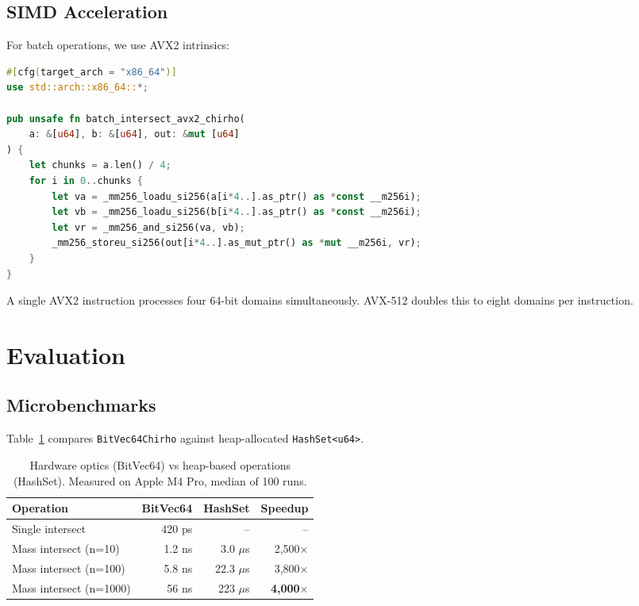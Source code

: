 \documentclass[11pt,a4paper]{article}
\newcommand{\bitvec}{\texttt{BitVec64Chirho}\xspace}
\begin{document}
\subsection{SIMD Acceleration}
\label{sec:simd}

For batch operations, we use AVX2 intrinsics:

\begin{lstlisting}[language=Rust]
#[cfg(target_arch = "x86_64")]
use std::arch::x86_64::*;

pub unsafe fn batch_intersect_avx2_chirho(
    a: &[u64], b: &[u64], out: &mut [u64]
) {
    let chunks = a.len() / 4;
    for i in 0..chunks {
        let va = _mm256_loadu_si256(a[i*4..].as_ptr() as *const __m256i);
        let vb = _mm256_loadu_si256(b[i*4..].as_ptr() as *const __m256i);
        let vr = _mm256_and_si256(va, vb);
        _mm256_storeu_si256(out[i*4..].as_mut_ptr() as *mut __m256i, vr);
    }
}
\end{lstlisting}

A single AVX2 instruction processes four 64-bit domains simultaneously.
AVX-512 doubles this to eight domains per instruction.

\section{Evaluation}
\label{sec:eval}

\subsection{Microbenchmarks}

Table~\ref{tab:micro} compares \bitvec against heap-allocated \texttt{HashSet<u64>}.

\begin{table}[ht]
\centering
\begin{tabular}{lrrr}
\toprule
\textbf{Operation} & \textbf{BitVec64} & \textbf{HashSet} & \textbf{Speedup} \\
\midrule
Single intersect & 420 ps & -- & -- \\
Mass intersect (n=10) & 1.2 ns & 3.0 $\mu$s & 2,500$\times$ \\
Mass intersect (n=100) & 5.8 ns & 22.3 $\mu$s & 3,800$\times$ \\
Mass intersect (n=1000) & 56 ns & 223 $\mu$s & \textbf{4,000$\times$} \\
\bottomrule
\end{tabular}
\caption{Hardware optics (BitVec64) vs heap-based operations (HashSet). Measured on Apple M4 Pro, median of 100 runs.}
\label{tab:micro}
\end{table}
\end{document}
